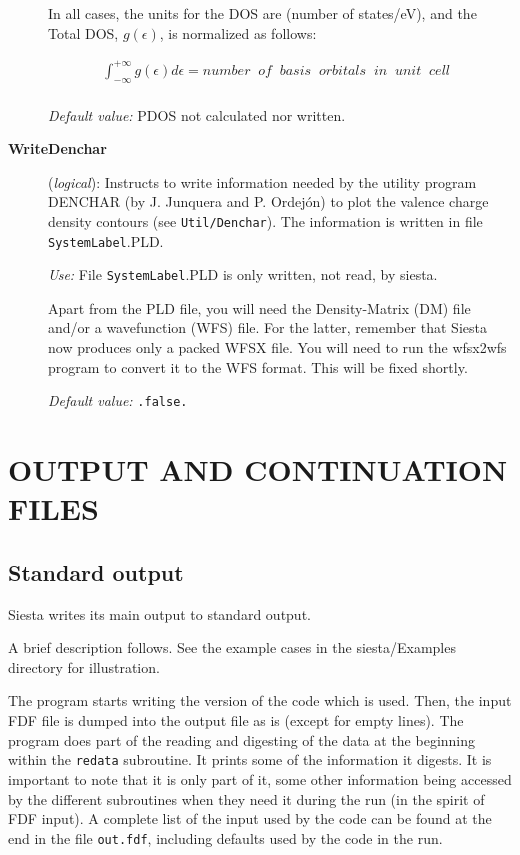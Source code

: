 \documentclass[11pt]{article}
\begin{document}
\begin{description}
In all cases, the units for the DOS are (number of states/eV), and the
Total DOS, $g \left(\epsilon\right)$, is normalized as follows:

\begin{eqnarray}
   \int_{-\infty}^{+\infty} g \left(\epsilon\right) d\epsilon = 
   number \;\; of \;\; basis \;\; orbitals \;\; in \;\;  unit \;\; cell \;\;
   \nonumber \\
\end{eqnarray}


{\it Default value:} PDOS not calculated nor written.

\item[{\bf WriteDenchar}] ({\it logical}):
Instructs to write information needed by the utility program
DENCHAR (by J. Junquera and P. Ordej\'on) to plot the valence charge density
contours (see {\tt Util/Denchar}). The information is written in file {\tt SystemLabel}.PLD.
 
{\it Use:} File {\tt SystemLabel}.PLD is only written, not read, by siesta.
 
Apart from the PLD file, you will need the Density-Matrix (DM) file
and/or a wavefunction (WFS) file. For the latter, remember that Siesta
now produces only a packed WFSX file. You will need to run the
wfsx2wfs program to convert it to the WFS format. This will be fixed
shortly.

{\it Default value:} {\tt .false.}

\end{description}
        

\section{OUTPUT AND CONTINUATION FILES}

\subsection{Standard output} 

{\sc Siesta} writes its main output to standard output. 

A brief description follows. See the example cases in the 
siesta/Examples directory for illustration. 

The program starts writing the version of
the code which is used. Then, the input FDF file is dumped into
the output file as is (except for empty lines). The program does
part of the reading and digesting of the data at the beginning
within the {\tt redata} subroutine. It prints some of the information
it digests. It is important to note that it is only part of it,
some other information being accessed by the different subroutines
when they need it during the run (in the spirit of FDF input).
A complete list of the input used by the code can be found at the
end in the file {\tt out.fdf}, including defaults used by the code
in the run.
\end{document}
